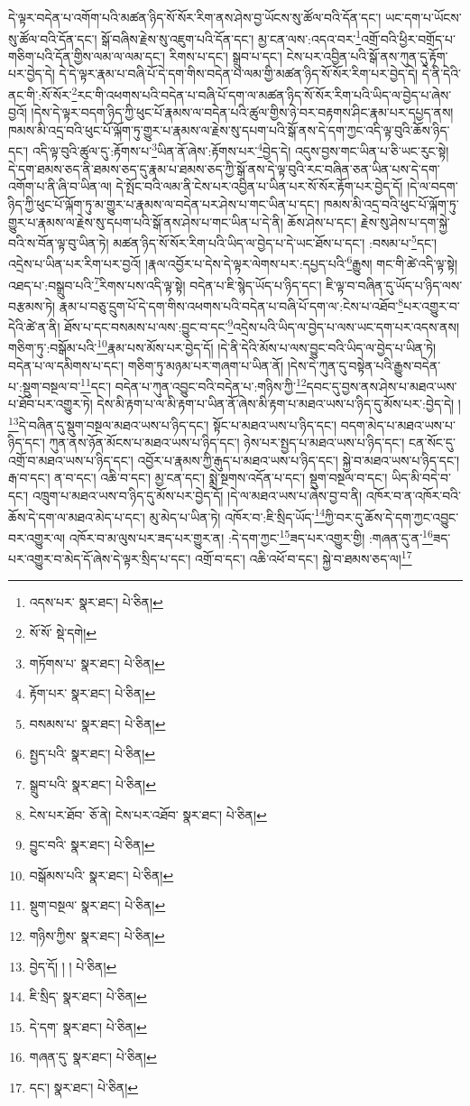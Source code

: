 དེ་ལྟར་བདེན་པ་འགོག་པའི་མཚན་ཉིད་སོ་སོར་རིག་ནས་ཤེས་བྱ་ཡོངས་སུ་ཚོལ་བའི་དོན་དང་། ཡང་དག་པ་ཡོངས་སུ་ཚོལ་བའི་དོན་དང་། སྒོ་བཞིས་རྗེས་སུ་འཇུག་པའི་དོན་དང་། མྱ་ངན་ལས་:འདའ་བར་\footnote{འདས་པར་  སྣར་ཐང་།  པེ་ཅིན། }འགྲོ་བའི་ཕྱིར་བགྲོད་པ་གཅིག་པའི་དོན་གྱིས་ལམ་ལ་ལམ་དང་། རིགས་པ་དང་། སྒྲུབ་པ་དང་། ངེས་པར་འབྱིན་པའི་སྒོ་ནས་ཀུན་དུ་རྟོག་པར་བྱེད་དེ། དེ་དེ་ལྟར་རྣམ་པ་བཞི་པོ་དེ་དག་གིས་བདེན་པ་ལམ་གྱི་མཚན་ཉིད་སོ་སོར་རིག་པར་བྱེད་དེ། དེ་ནི་དེའི་ནང་གི་:སོ་སོར་\footnote{སོ་སོ་  སྡེ་དགེ། }རང་གི་འཕགས་པའི་བདེན་པ་བཞི་པོ་དག་ལ་མཚན་ཉིད་སོ་སོར་རིག་པའི་ཡིད་ལ་བྱེད་པ་ཞེས་བྱའོ། །དེས་དེ་ལྟར་བདག་ཉིད་ཀྱི་ཕུང་པོ་རྣམས་ལ་བདེན་པའི་ཚུལ་གྱིས་ཉེ་བར་བརྟགས་ཤིང་རྣམ་པར་དཔྱད་ནས། ཁམས་མི་འདྲ་བའི་ཕུང་པོ་ལྐོག་ཏུ་གྱུར་པ་རྣམས་ལ་རྗེས་སུ་དཔག་པའི་སྒོ་ནས་དེ་དག་ཀྱང་འདི་ལྟ་བུའི་ཆོས་ཉིད་དང་། འདི་ལྟ་བུའི་ཚུལ་དུ་:རྟོགས་པ་\footnote{གཏོགས་པ་  སྣར་ཐང་།  པེ་ཅིན། }ཡིན་ནོ་ཞེས་:རྟོགས་པར་\footnote{རྟོག་པར་  སྣར་ཐང་།  པེ་ཅིན། }བྱེད་དེ། འདུས་བྱས་གང་ཡིན་པ་ཅི་ཡང་རུང་སྟེ། དེ་དག་ཐམས་ཅད་ནི་ཐམས་ཅད་དུ་རྣམ་པ་ཐམས་ཅད་ཀྱི་སྒོ་ནས་དེ་ལྟ་བུའི་རང་བཞིན་ཅན་ཡིན་པས་དེ་དག་འགོག་པ་ནི་ཞི་བ་ཡིན་ལ། དེ་སྤོང་བའི་ལམ་ནི་ངེས་པར་འབྱིན་པ་ཡིན་པར་སོ་སོར་རྟོག་པར་བྱེད་དོ། །དེ་ལ་བདག་ཉིད་ཀྱི་ཕུང་པོ་ལྐོག་ཏུ་མ་གྱུར་པ་རྣམས་ལ་བདེན་པར་ཤེས་པ་གང་ཡིན་པ་དང་། ཁམས་མི་འདྲ་བའི་ཕུང་པོ་ལྐོག་ཏུ་གྱུར་པ་རྣམས་ལ་རྗེས་སུ་དཔག་པའི་སྒོ་ནས་ཤེས་པ་གང་ཡིན་པ་དེ་ནི། ཆོས་ཤེས་པ་དང་། རྗེས་སུ་ཤེས་པ་དག་སྐྱེ་བའི་ས་བོན་ལྟ་བུ་ཡིན་ཏེ། མཚན་ཉིད་སོ་སོར་རིག་པའི་ཡིད་ལ་བྱེད་པ་དེ་ཡང་ཐོས་པ་དང་། :བསམ་པ་\footnote{བསམས་པ་  སྣར་ཐང་།  པེ་ཅིན། }དང་། འདྲེས་པ་ཡིན་པར་རིག་པར་བྱའོ། །རྣལ་འབྱོར་པ་དེས་དེ་ལྟར་ལེགས་པར་:དཔྱད་པའི་\footnote{སྤྱད་པའི་  སྣར་ཐང་།  པེ་ཅིན། }རྒྱུས། གང་གི་ཚེ་འདི་ལྟ་སྟེ། འཐད་པ་:བསྒྲུབ་པའི་\footnote{སྒྲུབ་པའི་  སྣར་ཐང་།  པེ་ཅིན། }རིགས་པས་འདི་ལྟ་སྟེ། བདེན་པ་ཇི་སྙེད་ཡོད་པ་ཉིད་དང་། ཇི་ལྟ་བ་བཞིན་དུ་ཡོད་པ་ཉིད་ལས་བརྩམས་ཏེ། རྣམ་པ་བཅུ་དྲུག་པོ་དེ་དག་གིས་འཕགས་པའི་བདེན་པ་བཞི་པོ་དག་ལ་:ངེས་པ་འཐོབ་\footnote{ངེས་པར་ཐོབ་  ཅོ་ནེ། ངེས་པར་འཐོབ་  སྣར་ཐང་།  པེ་ཅིན། }པར་འགྱུར་བ་དེའི་ཚེ་ན་ནི། ཐོས་པ་དང་བསམས་པ་ལས་:བྱུང་བ་དང་\footnote{བྱུང་བའི་  སྣར་ཐང་།  པེ་ཅིན། }འདྲེས་པའི་ཡིད་ལ་བྱེད་པ་ལས་ཡང་དག་པར་འདས་ནས། གཅིག་ཏུ་:བསྒོམ་པའི་\footnote{བསྒོམས་པའི་  སྣར་ཐང་།  པེ་ཅིན། }རྣམ་པས་མོས་པར་བྱེད་དོ། །དེ་ནི་དེའི་མོས་པ་ལས་བྱུང་བའི་ཡིད་ལ་བྱེད་པ་ཡིན་ཏེ། བདེན་པ་ལ་དམིགས་པ་དང་། གཅིག་ཏུ་མཉམ་པར་གཞག་པ་ཡིན་ནོ། །དེས་དེ་ཀུན་དུ་བསྟེན་པའི་རྒྱུས་བདེན་པ་:སྡུག་བསྔལ་བ་\footnote{སྡུག་བསྔལ་  སྣར་ཐང་།  པེ་ཅིན། }དང་། བདེན་པ་ཀུན་འབྱུང་བའི་བདེན་པ་:གཉིས་ཀྱི་\footnote{གཉིས་ཀྱིས་  སྣར་ཐང་།  པེ་ཅིན། }དབང་དུ་བྱས་ནས་ཤེས་པ་མཐའ་ཡས་པ་ཐོབ་པར་འགྱུར་ཏེ། དེས་མི་རྟག་པ་ལ་མི་རྟག་པ་ཡིན་ནོ་ཞེས་མི་རྟག་པ་མཐའ་ཡས་པ་ཉིད་དུ་མོས་པར་:བྱེད་དེ། །\footnote{བྱེད་དོ། ། །  པེ་ཅིན། }དེ་བཞིན་དུ་སྡུག་བསྔལ་མཐའ་ཡས་པ་ཉིད་དང་། སྟོང་པ་མཐའ་ཡས་པ་ཉིད་དང་། བདག་མེད་པ་མཐའ་ཡས་པ་ཉིད་དང་། ཀུན་ནས་ཉོན་མོངས་པ་མཐའ་ཡས་པ་ཉིད་དང་། ཉེས་པར་སྤྱད་པ་མཐའ་ཡས་པ་ཉིད་དང་། ངན་སོང་དུ་འགྲོ་བ་མཐའ་ཡས་པ་ཉིད་དང་། འབྱོར་པ་རྣམས་ཀྱི་རྒུད་པ་མཐའ་ཡས་པ་ཉིད་དང་། སྐྱེ་བ་མཐའ་ཡས་པ་ཉིད་དང་། རྒ་བ་དང་། ན་བ་དང་། འཆི་བ་དང་། མྱ་ངན་དང་། སྨྲེ་སྔགས་འདོན་པ་དང་། སྡུག་བསྔལ་བ་དང་། ཡིད་མི་བདེ་བ་དང་། འཁྲུག་པ་མཐའ་ཡས་བ་ཉིད་དུ་མོས་པར་བྱེད་དོ། །དེ་ལ་མཐའ་ཡས་པ་ཞེས་བྱ་བ་ནི། འཁོར་བ་ན་འཁོར་བའི་ཆོས་དེ་དག་ལ་མཐའ་མེད་པ་དང་། མུ་མེད་པ་ཡིན་ཏེ། འཁོར་བ་:ཇི་སྲིད་ཡོད་\footnote{ཇི་སྲིད་  སྣར་ཐང་།  པེ་ཅིན། }ཀྱི་བར་དུ་ཆོས་དེ་དག་ཀྱང་འབྱུང་བར་འགྱུར་ལ། འཁོར་བ་མ་ལུས་པར་ཟད་པར་གྱུར་ན། :དེ་དག་ཀྱང་\footnote{དེ་དག་  སྣར་ཐང་།  པེ་ཅིན། }ཟད་པར་འགྱུར་གྱི། :གཞན་དུ་ན་\footnote{གཞན་དུ་  སྣར་ཐང་།  པེ་ཅིན། }ཟད་པར་འགྱུར་བ་མེད་དོ་ཞེས་དེ་ལྟར་སྲིད་པ་དང་། འགྲོ་བ་དང་། འཆི་འཕོ་བ་དང་། སྐྱེ་བ་ཐམས་ཅད་ལ།\footnote{དང་།  སྣར་ཐང་།  པེ་ཅིན། } 
